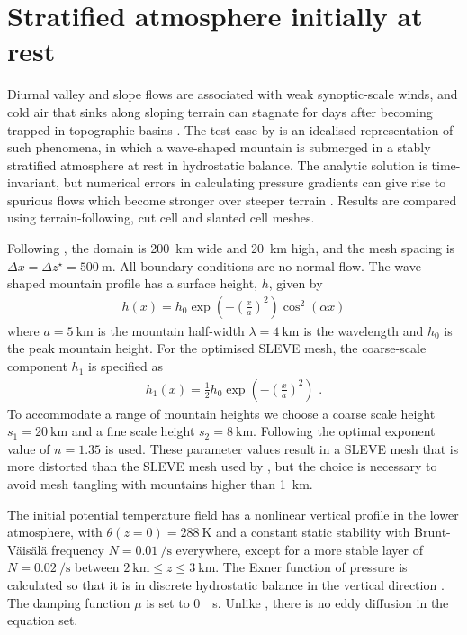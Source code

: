 \section{Stratified atmosphere initially at rest}
\label{sec:slanted:resting}

Diurnal valley and slope flows are associated with weak synoptic-scale winds, and cold air that sinks along sloping terrain can stagnate for days after becoming trapped in topographic basins \citep{chow2013}.
The test case by \citet{klemp2011} is an idealised representation of such phenomena, in which a wave-shaped mountain is submerged in a stably stratified atmosphere at rest in hydrostatic balance.
The analytic solution is time-invariant, but numerical errors in calculating pressure gradients can give rise to spurious flows which become stronger over steeper terrain \citep{klemp2011}.
Results are compared using terrain-following, cut cell and slanted cell meshes.

Following \cite{klemp2011}, the domain is \SI{200}{\kilo\meter} wide and \SI{20}{\kilo\meter} high, and the mesh spacing is \(\Delta x = \Delta z^\star = \SI{500}{\meter}\).  All boundary conditions are no normal flow.
The wave-shaped mountain profile has a surface height, $h$, given by
\begin{align}
	h(x) = h_0 \exp \left( - \left( \frac{x}{a} \right)^2 \right) \cos^2 \left( \alpha x \right) \label{eqn:resting:mountain}
\end{align}
where $a = \SI{5}{\kilo\meter}$ is the mountain half-width $\lambda = \SI{4}{\kilo\meter}$ is the wavelength and $h_0$ is the peak mountain height.  For the optimised SLEVE mesh, the coarse-scale component $h_1$ is specified as
\begin{align}
	h_1(x) = \frac{1}{2} h_0 \exp \left( - \left( \frac{x}{a} \right)^2 \right) \text{ .}
\end{align}
To accommodate a range of mountain heights we choose a coarse scale height $s_1 = \SI{20}{\kilo\meter}$ and a fine scale height $s_2 = \SI{8}{\kilo\meter}$.  Following \citet{leuenberger2010} the optimal exponent value of $n = \num{1.35}$ is used.  These parameter values result in a SLEVE mesh that is more distorted than the SLEVE mesh used by \citet{klemp2011}, but the choice is necessary to avoid mesh tangling with mountains higher than \SI{1}{\kilo\meter}.

The initial potential temperature field has a nonlinear vertical profile in the lower atmosphere, with $\theta(z = 0) = \SI{288}{\kelvin}$ and a constant static stability with Brunt-V\"ais\"al\"a frequency $N = \SI{0.01}{\per\second}$ everywhere, except for a more stable layer of $N = \SI{0.02}{\per\second}$ between $\SI{2}{\kilo\meter} \leq z \leq \SI{3}{\kilo\meter}$.
The Exner function of pressure is calculated so that it is in discrete hydrostatic balance in the vertical direction \citep{weller-shahrokhi2014}.  The damping function \(\mu\) is set to \SI{0}{\per\second}.  Unlike \citet{klemp2011}, there is no eddy diffusion in the equation set.

